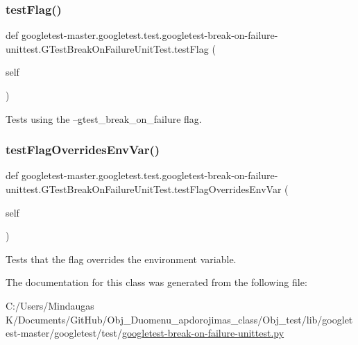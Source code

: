 \subsubsection{\texorpdfstring{testFlag()}{testFlag()}}
{\footnotesize\ttfamily def googletest-\/master.\+googletest.\+test.\+googletest-\/break-\/on-\/failure-\/unittest.\+G\+Test\+Break\+On\+Failure\+Unit\+Test.\+test\+Flag (\begin{DoxyParamCaption}\item[{}]{self }\end{DoxyParamCaption})}

\begin{DoxyVerb}Tests using the --gtest_break_on_failure flag.\end{DoxyVerb}
 \mbox{\label{classgoogletest-master_1_1googletest_1_1test_1_1googletest-break-on-failure-unittest_1_1_g_test_break_on_failure_unit_test_a78eeb7684a8a47d252ec85bb431582ec}} 
\subsubsection{\texorpdfstring{testFlagOverridesEnvVar()}{testFlagOverridesEnvVar()}}
{\footnotesize\ttfamily def googletest-\/master.\+googletest.\+test.\+googletest-\/break-\/on-\/failure-\/unittest.\+G\+Test\+Break\+On\+Failure\+Unit\+Test.\+test\+Flag\+Overrides\+Env\+Var (\begin{DoxyParamCaption}\item[{}]{self }\end{DoxyParamCaption})}

\begin{DoxyVerb}Tests that the flag overrides the environment variable.\end{DoxyVerb}
 

The documentation for this class was generated from the following file\+:\begin{DoxyCompactItemize}
\item 
C\+:/\+Users/\+Mindaugas K/\+Documents/\+Git\+Hub/\+Obj\+\_\+\+Duomenu\+\_\+apdorojimas\+\_\+class/\+Obj\+\_\+test/lib/googletest-\/master/googletest/test/\mbox{\hyperlink{_obj__test_2lib_2googletest-master_2googletest_2test_2googletest-break-on-failure-unittest_8py}{googletest-\/break-\/on-\/failure-\/unittest.\+py}}\end{DoxyCompactItemize}
